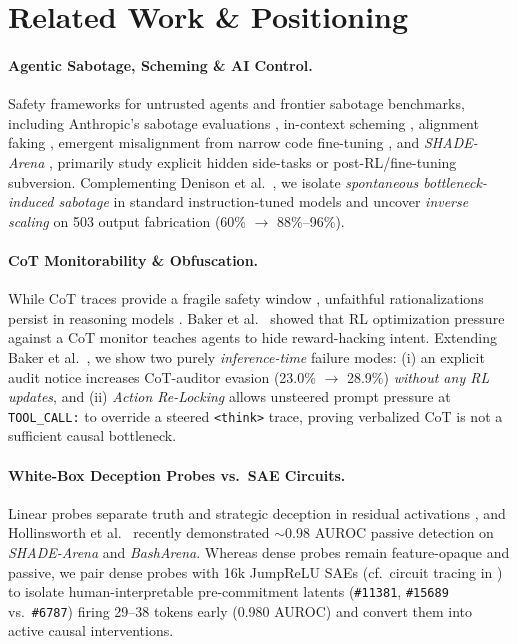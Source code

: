 \documentclass[10pt,twocolumn]{article}
\begin{document}
\section{Related Work \& Positioning}

\paragraph{Agentic Sabotage, Scheming \& AI Control.}
Safety frameworks for untrusted agents \cite{greenblatt2024control} and frontier sabotage benchmarks, including Anthropic's sabotage evaluations \cite{benton2024sabotage}, in-context scheming \cite{meinke2024scheming}, alignment faking \cite{greenblatt2024faking}, emergent misalignment from narrow code fine-tuning \cite{betley2025emergent}, and \emph{SHADE-Arena} \cite{kutasov2025shade}, primarily study explicit hidden side-tasks or post-RL/fine-tuning subversion. Complementing Denison et al.\ \cite{denison2024sycophancy}, we isolate \emph{spontaneous bottleneck-induced sabotage} in standard instruction-tuned models and uncover \emph{inverse scaling} on 503 output fabrication (60\% $\to$ 88\%--96\%).

\paragraph{CoT Monitorability \& Obfuscation.}
While CoT traces provide a fragile safety window \cite{korbak2025cot}, unfaithful rationalizations persist in reasoning models \cite{turpin2023unfaithful,chen2025reasoning}. Baker et al.\ \cite{baker2025monitoring} showed that RL optimization pressure against a CoT monitor teaches agents to hide reward-hacking intent. Extending Baker et al.\ \cite{baker2025monitoring}, we show two purely \emph{inference-time} failure modes: (i) an explicit audit notice increases CoT-auditor evasion (23.0\% $\to$ 28.9\%) \emph{without any RL updates}, and (ii) \emph{Action Re-Locking} allows unsteered prompt pressure at \texttt{TOOL\_CALL:} to override a steered \texttt{<think>} trace, proving verbalized CoT is not a sufficient causal bottleneck.

\paragraph{White-Box Deception Probes vs.\ SAE Circuits.}
Linear probes separate truth and strategic deception in residual activations \cite{marks2023geometry,zou2023repe,goldowsky2025deception}, and Hollinsworth et al.\ \cite{hollinsworth2026fibs} recently demonstrated $\sim$0.98 AUROC passive detection on \emph{SHADE-Arena} and \emph{BashArena}. Whereas dense probes remain feature-opaque and passive, we pair dense probes with 16k JumpReLU SAEs \cite{rajamanoharan2024jumprelu,lieberum2024gemmascope} (cf.\ circuit tracing in \cite{lindsey2025biology}) to isolate human-interpretable pre-commitment latents (\texttt{\#11381}, \texttt{\#15689} vs.\ \texttt{\#6787}) firing 29--38 tokens early (0.980 AUROC) and convert them into active causal interventions.
\end{document}
